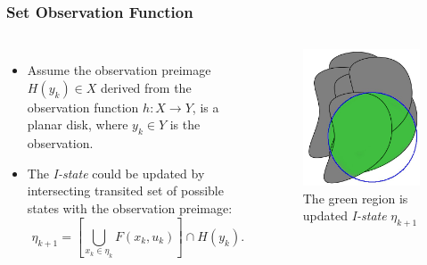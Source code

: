\documentclass[compress]{beamer}
\begin{document}
\begin{frame}\frametitle{Set Observation Function}
\begin{columns}
\begin{itemize}
\item Assume the observation preimage $H(y_k) \in X$ derived from the observation function $h: X \to Y$,
is a planar disk, where $y_k \in Y$ is the observation. \\

\item The \emph{I-state} could be updated by intersecting transited set of possible states with the
observation preimage:\\
\begin{equation}\label{eq:itrans}
		\eta_{k+1} =
		 \left[ \bigcup_{x_k \in \eta_k} F(x_k, u_k) \right]
		\cap H(y_k).
	\end{equation}
\end{itemize}
 \begin{figure}
    \includegraphics[scale=0.25]{xk_intersect.jpg}
    \caption{The green region is updated \emph{I-state} $\eta_{k+1}$}
    \end{figure}
\end{columns}
\transboxout
\end{frame}
\end{document}
